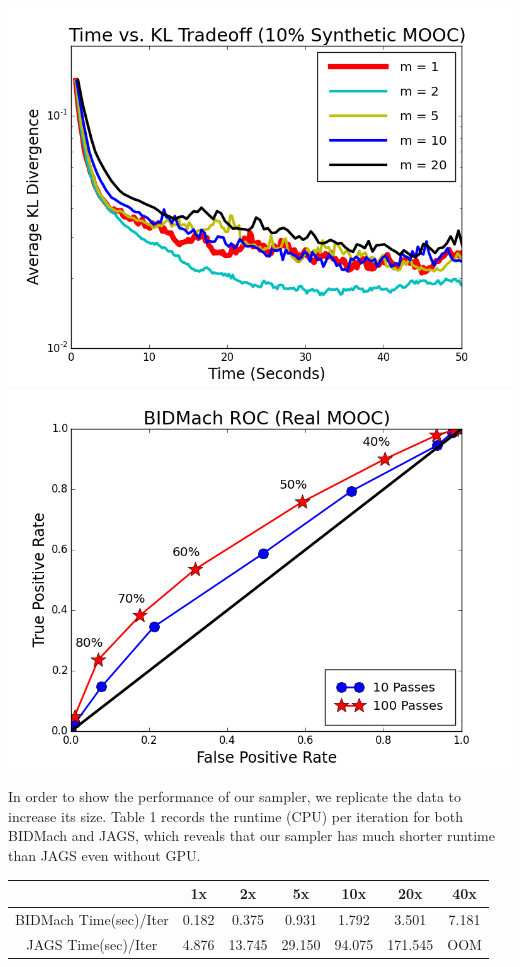 \documentclass[a0paper,portrait]{baposter}
\begin{document}
\begin{poster}
{\begin{center}
\includegraphics[width=0.45\linewidth]{fig_kltime_tradeoff_mooc.png}
\includegraphics[width=0.45\linewidth]{test.png}
\end{center}




In order to show the performance of our sampler, we replicate the data to increase its size. Table 1 records the runtime (CPU) per iteration for both BIDMach and JAGS, which reveals that our sampler has much shorter runtime than JAGS even without GPU. 

\begin{center}
\begin{tabular}{ |c|c|c|c|c|c|c| } 
\hline
                  & 1x    & 2x    & 5x    & 10x   & 20x   & 40x   \\
\hline \hline
BIDMach Time(sec)/Iter & 0.182 & 0.375 & 0.931 & 1.792 & 3.501 & 7.181 \\ 
JAGS Time(sec)/Iter    & 4.876 & 13.745 & 29.150 & 94.075 & 171.545 & OOM \\
\hline
\end{tabular}
\end{center}

}
\end{poster}
\end{document}
